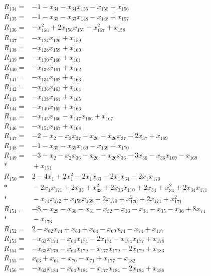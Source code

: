 \begin{align*}
R_{134}={}&-1-x_{34}-x_{34}x_{155}-x_{155}+x_{156}\\[3pt]
R_{135}={}&-1-x_{33}-x_{33}x_{148}-x_{148}+x_{157}\\[3pt]
R_{136}={}&-x_{156}^{2}+2x_{156}x_{157}-x_{157}^{2}+x_{158}\\[3pt]
R_{137}={}&-x_{124}x_{126}+x_{159}\\[3pt]
R_{138}={}&-x_{128}x_{159}+x_{160}\\[3pt]
R_{139}={}&-x_{130}x_{160}+x_{161}\\[3pt]
R_{140}={}&-x_{132}x_{161}+x_{162}\\[3pt]
R_{141}={}&-x_{134}x_{162}+x_{163}\\[3pt]
R_{142}={}&-x_{136}x_{163}+x_{164}\\[3pt]
R_{143}={}&-x_{138}x_{164}+x_{165}\\[3pt]
R_{144}={}&-x_{140}x_{165}+x_{166}\\[3pt]
R_{145}={}&-x_{145}x_{166}-x_{147}x_{166}+x_{167}\\[3pt]
R_{146}={}&-x_{154}x_{167}+x_{168}\\[3pt]
R_{147}={}&-2-x_{2}-x_{2}x_{37}-x_{26}-x_{26}x_{37}-2x_{37}+x_{169}\\[3pt]
R_{148}={}&-1-x_{35}-x_{35}x_{169}-x_{169}+x_{170}\\[3pt]
R_{149}={}&-3-x_{2}-x_{2}x_{36}-x_{26}-x_{26}x_{36}-3x_{36}-x_{36}x_{169}-x_{169}\\*
&{}+x_{171}\\[3pt]
R_{150}={}&2-4x_{1}+2x_{1}^{2}-2x_{1}x_{33}-2x_{1}x_{34}-2x_{1}x_{170}\\*
&{}-2x_{1}x_{171}+2x_{33}+x_{33}^{2}+2x_{33}x_{170}+2x_{34}+x_{34}^{2}+2x_{34}x_{171}\\*
&{}-x_{74}x_{172}+x_{158}x_{168}+2x_{170}+x_{170}^{2}+2x_{171}+x_{171}^{2}\\[3pt]
R_{151}={}&-8-x_{29}-x_{30}-x_{31}-x_{32}-x_{33}-x_{34}-x_{35}-x_{36}+8x_{74}\\*
&{}-x_{173}\\[3pt]
R_{152}={}&2-x_{62}x_{74}+x_{63}+x_{64}-x_{69}x_{74}-x_{74}+x_{177}\\[3pt]
R_{153}={}&-x_{63}x_{174}-x_{64}x_{174}-2x_{174}-x_{174}x_{177}+x_{178}\\[3pt]
R_{154}={}&-x_{63}x_{179}-x_{64}x_{179}-x_{177}x_{179}-2x_{179}+x_{183}\\[3pt]
R_{155}={}&x_{63}+x_{64}-x_{70}-x_{71}+x_{177}-x_{182}\\[3pt]
R_{156}={}&-x_{63}x_{184}-x_{64}x_{184}-x_{177}x_{184}-2x_{184}+x_{188}\\[3pt]

\end{align*}
